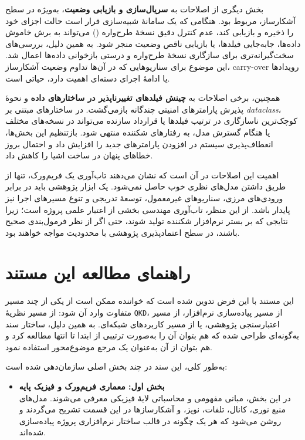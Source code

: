 \begin{sloppypar}
بخش دیگری از اصلاحات به \textbf{سریال‌سازی و بازیابی وضعیت}، به‌ویژه در سطح آشکارساز، مربوط بود. هنگامی که یک سامانهٔ شبیه‌سازی قرار است حالت اجزای خود را ذخیره و بازیابی کند، عدم کنترل دقیق نسخهٔ طرح‌واره () می‌تواند به برش خاموش داده‌ها، جابه‌جایی فیلدها، یا بازیابی ناقص وضعیت منجر شود. به همین دلیل، بررسی‌های سخت‌گیرانه‌تری برای سازگاری نسخهٔ طرح‌واره و درستی بازخوانی داده‌ها اعمال شد. این موضوع برای سناریوهایی که در آن‌ها تداوم وضعیت آشکارساز، carry-over رویدادها یا ادامهٔ اجرای دسته‌ای اهمیت دارد، حیاتی است.

همچنین، برخی اصلاحات به \textbf{چینش فیلدهای تغییرناپذیر در ساختارهای داده} و نحوهٔ پذیرش پارامترهای امنیتی چندگانه بازمی‌گشت. در ساختارهای مبتنی بر \textit{dataclass}، کوچک‌ترین ناسازگاری در ترتیب فیلدها یا قرارداد سازنده می‌تواند در نسخه‌های مختلف یا هنگام گسترش مدل، به رفتارهای شکننده منتهی شود. بازتنظیم این بخش‌ها، انعطاف‌پذیری سیستم در افزودن پارامترهای جدید را افزایش داد و احتمال بروز خطاهای پنهان در ساخت اشیا را کاهش داد.

اهمیت این اصلاحات در آن است که نشان می‌دهند تاب‌آوری یک فریم‌ورک، تنها از طریق داشتن مدل‌های نظری خوب حاصل نمی‌شود. یک ابزار پژوهشی باید در برابر ورودی‌های مرزی، سناریوهای غیرمعمول، توسعهٔ تدریجی و تنوع مسیرهای اجرا نیز پایدار باشد. از این منظر، تاب‌آوری مهندسی بخشی از اعتبار علمی پروژه است؛ زیرا نتایجی که بر بستر نرم‌افزار شکننده تولید شوند، حتی اگر از نظر فرمول‌بندی صحیح باشند، در سطح اعتمادپذیری پژوهشی با محدودیت مواجه خواهند بود.

\section*{راهنمای مطالعه این مستند}

این مستند با این فرض تدوین شده است که خواننده ممکن است از یکی از چند مسیر متفاوت وارد آن شود: از مسیر نظریهٔ \texttt{QKD}، از مسیر پیاده‌سازی نرم‌افزار، از مسیر اعتبارسنجی پژوهشی، یا از مسیر کاربردهای شبکه‌ای. به همین دلیل، ساختار سند به‌گونه‌ای طراحی شده که هم بتوان آن را به‌صورت ترتیبی از ابتدا تا انتها مطالعه کرد و هم بتوان از آن به‌عنوان یک مرجع موضوع‌محور استفاده نمود.

به‌طور کلی، این سند در چند بخش اصلی سازمان‌دهی شده است:

\begin{itemize}
	\item \textbf{بخش اول: معماری فریم‌ورک و فیزیک پایه} \\
	در این بخش، مبانی مفهومی و محاسباتی لایهٔ فیزیکی معرفی می‌شوند. مدل‌های منبع نوری، کانال، تلفات، نویز، و آشکارسازها در این قسمت تشریح می‌گردند و روشن می‌شود که هر یک چگونه در قالب ساختار نرم‌افزاری پروژه پیاده‌سازی شده‌اند.
	

\end{itemize}
\end{sloppypar}

